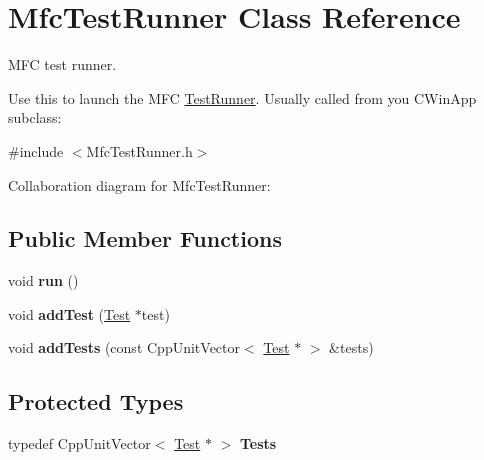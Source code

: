 \hypertarget{class_mfc_test_runner}{\section{Mfc\+Test\+Runner Class Reference}
\label{class_mfc_test_runner}
}


M\+F\+C test runner.

Use this to launch the M\+F\+C \hyperlink{class_test_runner}{Test\+Runner}. Usually called from you C\+Win\+App subclass\+:  




{\ttfamily \#include $<$Mfc\+Test\+Runner.\+h$>$}



Collaboration diagram for Mfc\+Test\+Runner\+:
\subsection*{Public Member Functions}
\begin{DoxyCompactItemize}
\item 
\hypertarget{class_mfc_test_runner_aea503f886c3a992b557d4dfc223bb0b2}{void {\bfseries run} ()}\label{class_mfc_test_runner_aea503f886c3a992b557d4dfc223bb0b2}

\item 
\hypertarget{class_mfc_test_runner_aedb029517afb5863e483bf9ff0d7d1ed}{void {\bfseries add\+Test} (\hyperlink{class_test}{Test} $\ast$test)}\label{class_mfc_test_runner_aedb029517afb5863e483bf9ff0d7d1ed}

\item 
\hypertarget{class_mfc_test_runner_a99c469dd7f65c820a378e217ca886fd9}{void {\bfseries add\+Tests} (const Cpp\+Unit\+Vector$<$ \hyperlink{class_test}{Test} $\ast$ $>$ \&tests)}\label{class_mfc_test_runner_a99c469dd7f65c820a378e217ca886fd9}

\end{DoxyCompactItemize}
\subsection*{Protected Types}
\begin{DoxyCompactItemize}
\item 
\hypertarget{class_mfc_test_runner_a6911063cb903f782927897e33df1692f}{typedef Cpp\+Unit\+Vector$<$ \hyperlink{class_test}{Test} $\ast$ $>$ {\bfseries Tests}}\label{class_mfc_test_runner_a6911063cb903f782927897e33df1692f}

\end{DoxyCompactItemize}
